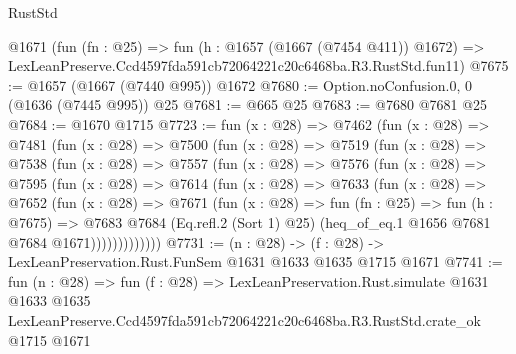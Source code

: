 \begin{lexlean}{RustStd}
\begin{coremodule}
    @1671
    (fun (fn : @25) =>
    fun (h : @1657 (@1667 (@7454 @411)) @1672) =>
    LexLeanPreserve.Ccd4597fda591cb72064221c20c6468ba.R3.RustStd.fun11)
@7675 := @1657 (@1667 (@7440 @995)) @1672
@7680 := Option.noConfusion.{0, 0} (@1636 (@7445 @995)) @25
@7681 := @665 @25
@7683 := @7680 @7681 @25
@7684 := @1670 @1715
@7723 := fun (x : @28) =>
  @7462
    (fun (x : @28) =>
    @7481
      (fun (x : @28) =>
      @7500
        (fun (x : @28) =>
        @7519
          (fun (x : @28) =>
          @7538
            (fun (x : @28) =>
            @7557
              (fun (x : @28) =>
              @7576
                (fun (x : @28) =>
                @7595
                  (fun (x : @28) =>
                  @7614
                    (fun (x : @28) =>
                    @7633
                      (fun (x : @28) =>
                      @7652
                        (fun (x : @28) =>
                        @7671
                          (fun (x : @28) =>
                          fun (fn : @25) =>
                          fun (h : @7675) =>
                          @7683
                            @7684
                            (Eq.refl.{2} (Sort 1) @25)
                            (heq_of_eq.{1} @1656 @7681 @7684 @1671)))))))))))))
@7731 := (n : @28) -> (f : @28) -> LexLeanPreservation.Rust.FunSem @1631 @1633 @1635 @1715 @1671
@7741 := fun (n : @28) =>
  fun (f : @28) =>
  LexLeanPreservation.Rust.simulate
    @1631
    @1633
    @1635
    LexLeanPreserve.Ccd4597fda591cb72064221c20c6468ba.R3.RustStd.crate_ok
    @1715
    @1671
\end{coremodule}
\end{lexlean}

